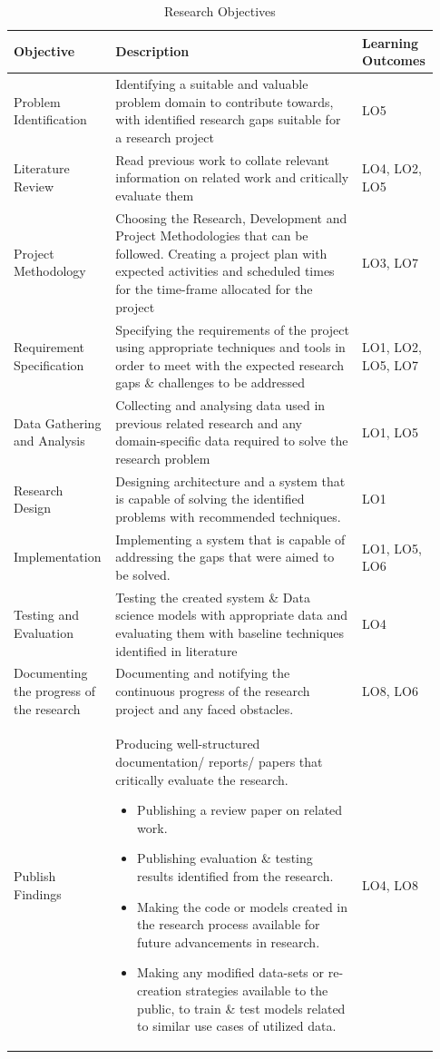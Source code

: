 \documentclass[a4paper, 12pt, oneside]{report}
\begin{document}
\begin{longtable}{| p{0.23\linewidth} | p{0.58\linewidth}| p{0.12\linewidth}|}
\caption{Research Objectives}
\label{tab:research-objectives-table}\\
\hline
Objective &   Description & Learning Outcomes  \\ 
\hline
Problem Identification & Identifying a suitable and valuable problem domain to contribute towards, with identified research gaps suitable for a research project & LO5 \\
\hline
Literature Review & Read previous work to collate relevant information on related work and critically evaluate them & LO4, LO2, LO5 \\
\hline
Project Methodology & Choosing the Research, Development and Project Methodologies that can be followed. Creating a project plan with expected activities and scheduled times for the time-frame allocated for the project & LO3, LO7 \\
\hline
Requirement Specification & Specifying the requirements of the project using appropriate techniques and tools in order to meet with the expected research gaps \& challenges to be addressed & LO1, LO2, LO5, LO7\\
\hline
Data Gathering and Analysis & Collecting and analysing data used in previous related research and any domain-specific data required to solve the research problem  & LO1, LO5 \\
\hline
Research Design & Designing architecture and a system that is capable of solving the identified problems with recommended techniques. & LO1 \\
\hline
Implementation & Implementing a system that is capable of addressing the gaps that were aimed to be solved. & LO1, LO5, LO6 \\
\hline
Testing and Evaluation & Testing the created system \& Data science models with appropriate data and evaluating them with baseline techniques identified in literature & LO4 \\
\hline
Documenting the progress of the research & Documenting and notifying the continuous progress of the research project and any faced obstacles. & LO8, LO6 \\
\hline
Publish Findings & Producing well-structured documentation/ reports/ papers that critically evaluate the research.
\begin{itemize}
\item Publishing a review paper on related work.
\item Publishing evaluation \& testing results identified from the research.
\item Making the code or models created in the research process available for future advancements in research.
\item Making any modified data-sets or re-creation strategies available to the public, to train \& test models related to similar use cases of utilized data.
\end{itemize}
& LO4, LO8 \\
\hline
\end{longtable}
\end{document}

